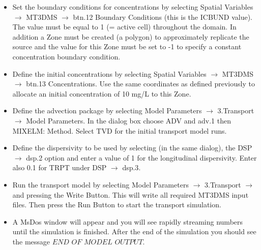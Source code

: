 \begin{itemize}

\item Set the boundary conditions for concentrations by selecting 
{\color{blue}Spatial Variables} $\rightarrow$ {\color{blue}MT3DMS} 
$\rightarrow$ {\color{blue}btn.12 Boundary Conditions} (this is the ICBUND value). 
The value must be equal to 1 (= active cell) throughout the domain. In addition 
a {\color{blue}Zone} must be created (a polygon) to approximately replicate 
the source and the value for this {\color{blue}Zone} must be set to -1 
to specify a constant concentration boundary condition.

\item Define the initial concentrations by selecting 
{\color{blue}Spatial Variables} $\rightarrow$ {\color{blue}MT3DMS} 
$\rightarrow$ {\color{blue}btn.13 Concentrations}. 
Use the same coordinates as defined previously to allocate 
an initial concentration of 10 mg/L to this {\color{blue}Zone}.

\item Define the advection package by selecting 
{\color{blue}Model Parameters} $\rightarrow$ {\color{blue}3.Transport} $\rightarrow$ 
{\color{blue}Model Parameters}. In the dialog box choose {\color{blue}ADV} and  
{\color{blue}adv.1} then {\color{blue}MIXELM: Method}. 
Select {\color{blue}TVD} for the initial transport model runs.

\item Define the dispersivity to be used by selecting (in the same dialog), 
the {\color{blue}DSP} $\rightarrow$ {\color{blue}dsp.2} option and 
enter a value of 1 for the longitudinal 
dispersivity. Enter also 0.1 for TRPT under {\color{blue}DSP} $\rightarrow$ {\color{blue}dsp.3}. 

\item Run the transport model by selecting 
{\color{blue}Model Parameters} $\rightarrow$ 
{\color{blue}3.Transport} $\rightarrow$ and pressing the {\color{blue}Write Button}. 
This will write all required {\color{blue}MT3DMS} 
input files. Then press the {\color{blue}Run Button} to start the transport simulation.

\item A MsDos window will appear and you will see rapidly streaming numbers 
until the simulation is finished. After the end of the simulation
you should see the message $END$ $OF$ $MODEL$ $OUTPUT$. 

\end{itemize}

